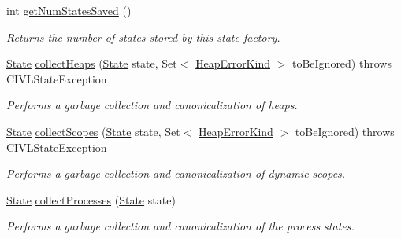 \begin{DoxyCompactItemize}
int \hyperlink{interfaceedu_1_1udel_1_1cis_1_1vsl_1_1civl_1_1state_1_1IF_1_1StateFactory_a5442b4d2a0f993e07a9bd403ebdcd917}{get\+Num\+States\+Saved} ()
\begin{DoxyCompactList}\small\item\em Returns the number of states stored by this state factory. \end{DoxyCompactList}\item 
\hyperlink{interfaceedu_1_1udel_1_1cis_1_1vsl_1_1civl_1_1state_1_1IF_1_1State}{State} \hyperlink{interfaceedu_1_1udel_1_1cis_1_1vsl_1_1civl_1_1state_1_1IF_1_1StateFactory_a78a17339ebd0be7dacaf1f06e78626d7}{collect\+Heaps} (\hyperlink{interfaceedu_1_1udel_1_1cis_1_1vsl_1_1civl_1_1state_1_1IF_1_1State}{State} state, Set$<$ \hyperlink{enumedu_1_1udel_1_1cis_1_1vsl_1_1civl_1_1state_1_1IF_1_1CIVLHeapException_1_1HeapErrorKind}{Heap\+Error\+Kind} $>$ to\+Be\+Ignored)  throws C\+I\+V\+L\+State\+Exception
\begin{DoxyCompactList}\small\item\em Performs a garbage collection and canonicalization of heaps. \end{DoxyCompactList}\item 
\hyperlink{interfaceedu_1_1udel_1_1cis_1_1vsl_1_1civl_1_1state_1_1IF_1_1State}{State} \hyperlink{interfaceedu_1_1udel_1_1cis_1_1vsl_1_1civl_1_1state_1_1IF_1_1StateFactory_a4ffda85305907c945cc3ffb2d3339eeb}{collect\+Scopes} (\hyperlink{interfaceedu_1_1udel_1_1cis_1_1vsl_1_1civl_1_1state_1_1IF_1_1State}{State} state, Set$<$ \hyperlink{enumedu_1_1udel_1_1cis_1_1vsl_1_1civl_1_1state_1_1IF_1_1CIVLHeapException_1_1HeapErrorKind}{Heap\+Error\+Kind} $>$ to\+Be\+Ignored)  throws C\+I\+V\+L\+State\+Exception
\begin{DoxyCompactList}\small\item\em Performs a garbage collection and canonicalization of dynamic scopes. \end{DoxyCompactList}\item 
\hyperlink{interfaceedu_1_1udel_1_1cis_1_1vsl_1_1civl_1_1state_1_1IF_1_1State}{State} \hyperlink{interfaceedu_1_1udel_1_1cis_1_1vsl_1_1civl_1_1state_1_1IF_1_1StateFactory_a57003566f5dd8c4905a7e630d90ad5ef}{collect\+Processes} (\hyperlink{interfaceedu_1_1udel_1_1cis_1_1vsl_1_1civl_1_1state_1_1IF_1_1State}{State} state)
\begin{DoxyCompactList}\small\item\em Performs a garbage collection and canonicalization of the process states. \end{DoxyCompactList}\item 

\end{DoxyCompactItemize}
